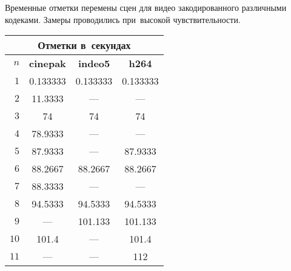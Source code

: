 {    Временные отметки перемены сцен
    для видео закодированного различными кодеками.
    Замеры проводились при~высокой чувствительности.
    \begin{center}
        \footnotesize
        \begin{tabular}{|r|c|c|c|}
            \hline
            \multicolumn{4}{|c|}{\footnotesize Отметки в~секундах} \\
            \hline $n$
                & \textbf{cinepak}
                &   \textbf{indeo5}
                &   \textbf{h264} \\
            \hline $1$  &0.133333   & 0.133333  & 0.133333  \\
            \hline $2$  &11.3333    & ---       & ---       \\
            \hline $3$  &74         & 74        & 74        \\
            \hline $4$  &78.9333    & ---       & ---       \\
            \hline $5$ &87.9333    & ---       & 87.9333   \\
            \hline $6$ &88.2667    & 88.2667   & 88.2667   \\
            \hline $7$ &88.3333    & ---       & ---       \\
            \hline $8$ &94.5333    & 94.5333   & 94.5333   \\
            \hline $9$ & ---       & 101.133   & 101.133   \\
            \hline $10$ &101.4      & ---       & 101.4     \\
            \hline $11$ &    ---    & ---       & 112       \\
            \hline
        \end{tabular}
    \end{center}
}
